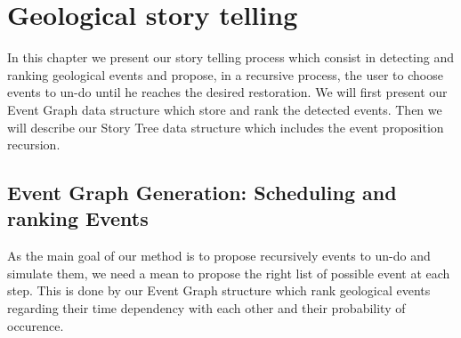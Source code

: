 \documentclass[12pt, a4paper]{report} %
\begin{document}
\chapter{Geological story telling}

In this chapter we present our story telling process which consist in detecting and ranking geological events and propose, in a recursive process, the user to choose events to un-do until he reaches the desired restoration.
We will first present our Event Graph data structure which store and rank the detected events. Then we will describe our Story Tree data structure which includes the event proposition recursion.

\section{Event Graph Generation: Scheduling and ranking Events}
\label{sec:eventgraph}
As the main goal of our method is to propose recursively events to un-do and simulate them, we need a mean to propose the right list of possible event at each step. This is done by our Event Graph structure which rank geological events regarding their time dependency with each other and their probability of occurence.
\end{document}
